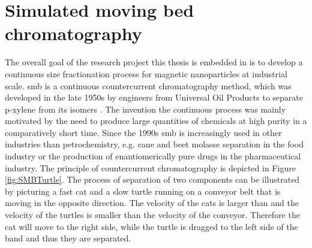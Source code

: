 \section{Simulated moving bed chromatography}
\label{sec:smb}
The overall goal of the research project this thesis is embedded in is to develop a continuous size fractionation process for magnetic nanoparticles at industrial scale. \Gls{smb} is a continuous countercurrent chromatography method, which was developed in the late 1950s by engineers from Universal Oil Products to separate p-xylene from its isomers \cite{broughton1961continuous} \cite{carson1962rotary}. The invention the continuous process was mainly motivated by the need to produce large quantities of chemicals at high purity in a comparatively short time. Since the 1990s \gls{smb} is increasingly used in other industries than petrochemistry, e.g. cane and beet molasse separation in the food industry or the production of enantiomerically pure drugs in the pharmaceutical industry. The principle of countercurrent chromatography is depicted in Figure \ref{fig:SMBTurtle}. The process of separation of two components can be illustrated by picturing a fast cat and a slow turtle running on a conveyor belt that is moving in the opposite direction. The velocity of the cats is larger than and the velocity of the turtles is smaller than the velocity of the conveyor. Therefore the cat will move to the right side, while the turtle is dragged to the left side of the band and thus they are separated.  

\begin{figure}[H]
\centering
{}
\end{figure}



